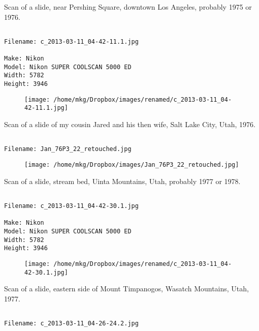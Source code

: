 \clearpage
\onecolumn
\noindent Scan of a slide, near Pershing Square, downtown Los Angeles, probably 1975 or 1976.
\noindent
\begin{lstlisting}

Filename: c_2013-03-11_04-42-11.1.jpg

Make: Nikon
Model: Nikon SUPER COOLSCAN 5000 ED
Width: 5782
Height: 3946
\end{lstlisting}
\clearpage

\begin{figure}
\texttt{[image: /home/mkg/Dropbox/images/renamed/c\_2013-03-11\_04-42-11.1.jpg]}
\end{figure}
    
\clearpage
\onecolumn
\noindent Scan of a slide of my cousin Jared and his then wife, Salt Lake City, Utah, 1976.
\noindent
\begin{lstlisting}

Filename: Jan_76P3_22_retouched.jpg

\end{lstlisting}
\clearpage

\begin{figure}
\texttt{[image: /home/mkg/Dropbox/images/Jan\_76P3\_22\_retouched.jpg]}
\end{figure}
    
\clearpage
\onecolumn
\noindent Scan of a slide, stream bed, Uinta Mountains, Utah, probably 1977 or 1978.
\noindent
\begin{lstlisting}

Filename: c_2013-03-11_04-42-30.1.jpg

Make: Nikon
Model: Nikon SUPER COOLSCAN 5000 ED
Width: 5782
Height: 3946
\end{lstlisting}
\clearpage

\begin{figure}
\texttt{[image: /home/mkg/Dropbox/images/renamed/c\_2013-03-11\_04-42-30.1.jpg]}
\end{figure}
    
\clearpage
\onecolumn
\noindent Scan of a slide, eastern side of Mount Timpanogos, Wasatch Mountains, Utah, 1977.
\noindent
\begin{lstlisting}

Filename: c_2013-03-11_04-26-24.2.jpg

\end{lstlisting}
\clearpage

